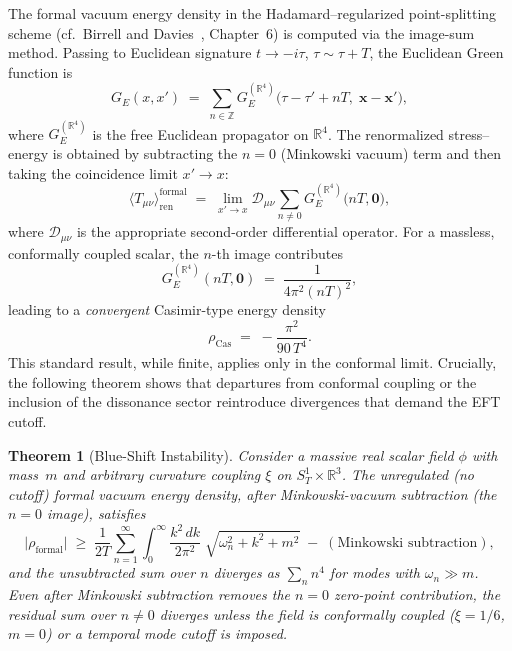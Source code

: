 \documentclass[12pt,openany]{book}
\theoremstyle{plain}
\newtheorem{efttheorem}{Theorem}[chapter]
\theoremstyle{definition}
\theoremstyle{remark}
\providecommand{\vev}[1]{\langle #1 \rangle}
\providecommand{\abs}[1]{\lvert #1 \rvert}
\providecommand{\Ren}{\mathrm{ren}}
\providecommand{\SoneR}{S^{1}_{T}\!\times\!\mathbb{R}^{3}}
\begin{document}
The formal vacuum energy density in the Hadamard--regularized
point-splitting scheme (cf.\ Birrell and Davies~\cite{BirrelDavies1982},
Chapter~6) is computed via the image-sum method.  Passing to Euclidean
signature $t \to -i\tau$, $\tau \sim \tau+T$, the Euclidean Green
function is
\begin{equation}\label{eq:eft-green}
  G_{E}(x,x')
  \;=\;
  \sum_{n\in\mathbb{Z}}
  G_{E}^{(\mathbb{R}^4)}\!\bigl(
    \tau-\tau'+nT,\;\mathbf{x}-\mathbf{x}'\bigr),
\end{equation}
where $G_{E}^{(\mathbb{R}^4)}$ is the free Euclidean propagator on
$\mathbb{R}^4$.  The renormalized stress--energy is obtained by
subtracting the $n=0$ (Minkowski vacuum) term and then taking the
coincidence limit $x' \to x$:
\begin{equation}\label{eq:eft-Tmunu-formal}
  \vev{T_{\mu\nu}}_{\Ren}^{\text{formal}}
  \;=\;
  \lim_{x'\to x} \mathcal{D}_{\mu\nu}
  \sum_{n \neq 0}
  G_{E}^{(\mathbb{R}^4)}\!\bigl(nT, \mathbf{0}\bigr),
\end{equation}
where $\mathcal{D}_{\mu\nu}$ is the appropriate second-order
differential operator.  For a massless, conformally coupled scalar, the
$n$-th image contributes
\begin{equation}\label{eq:eft-image-n}
  G_{E}^{(\mathbb{R}^4)}(nT, \mathbf{0})
  \;=\; \frac{1}{4\pi^{2}(nT)^{2}},
\end{equation}
leading to a \emph{convergent} Casimir-type energy density
\begin{equation}\label{eq:eft-casimir}
  \rho_{\mathrm{Cas}}
  \;=\;
  -\frac{\pi^{2}}{90\,T^{4}}.
\end{equation}
This standard result, while finite, applies only in the conformal
limit.  Crucially, the following theorem shows that departures from
conformal coupling or the inclusion of the dissonance sector
reintroduce divergences that demand the EFT cutoff.

\begin{efttheorem}[Blue-Shift Instability]
\label{thm:blueshift}
Consider a massive real scalar field $\phi$ with mass~$m$ and arbitrary
curvature coupling $\xi$ on $\SoneR$.  The unregulated (no cutoff)
formal vacuum energy density, after Minkowski-vacuum subtraction
(the $n=0$ image), satisfies
\begin{equation}\label{eq:eft-blueshift-bound}
  \abs{\rho_{\mathrm{formal}}}
  \;\geq\;
  \frac{1}{2T}
  \sum_{n=1}^{\infty}
  \int_0^{\infty}\!\frac{k^{2}\,dk}{2\pi^{2}}\;
  \sqrt{\omega_n^{2}+k^{2}+m^{2}}
  \;-\; (\text{Minkowski subtraction}),
\end{equation}
and the unsubtracted sum over $n$ diverges as $\sum_{n} n^{4}$ for
modes with $\omega_{n} \gg m$.  Even after Minkowski subtraction
removes the $n=0$ zero-point contribution, the residual sum over
$n \neq 0$ diverges unless the field is conformally coupled
($\xi = 1/6$, $m=0$) or a temporal mode cutoff is imposed.
\end{efttheorem}
\end{document}
